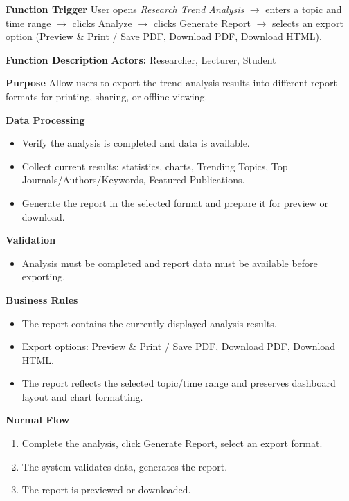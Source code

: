\documentclass[12pt,a4paper]{article}
\begin{document}
{{\textbf{Function Trigger}
User opens \textit{Research Trend Analysis} $\rightarrow$ enters a topic and time range $\rightarrow$ clicks Analyze $\rightarrow$ clicks Generate Report $\rightarrow$ selects an export option (Preview \& Print / Save PDF, Download PDF, Download HTML).
\medskip

\textbf{Function Description}
\textbf{Actors:} Researcher, Lecturer, Student
\medskip

\textbf{Purpose}
Allow users to export the trend analysis results into different report formats for printing, sharing, or offline viewing.
\medskip

\textbf{Data Processing}
\begin{itemize}[label=-]
	\item Verify the analysis is completed and data is available.
	\item Collect current results: statistics, charts, Trending Topics, Top Journals/Authors/Keywords, Featured Publications.
	\item Generate the report in the selected format and prepare it for preview or download.
\end{itemize}
\medskip

\textbf{Validation}
\begin{itemize}[label=-]
	\item Analysis must be completed and report data must be available before exporting.
\end{itemize}
\medskip

\textbf{Business Rules}
\begin{itemize}[label=-]
	\item The report contains the currently displayed analysis results.
	\item Export options: Preview \& Print / Save PDF, Download PDF, Download HTML.
	\item The report reflects the selected topic/time range and preserves dashboard layout and chart formatting.
\end{itemize}
\medskip

\textbf{Normal Flow}
\begin{enumerate}
	\item Complete the analysis, click Generate Report, select an export format.
	\item The system validates data, generates the report.
	\item The report is previewed or downloaded.
\end{enumerate}
\medskip

}}
\end{document}
